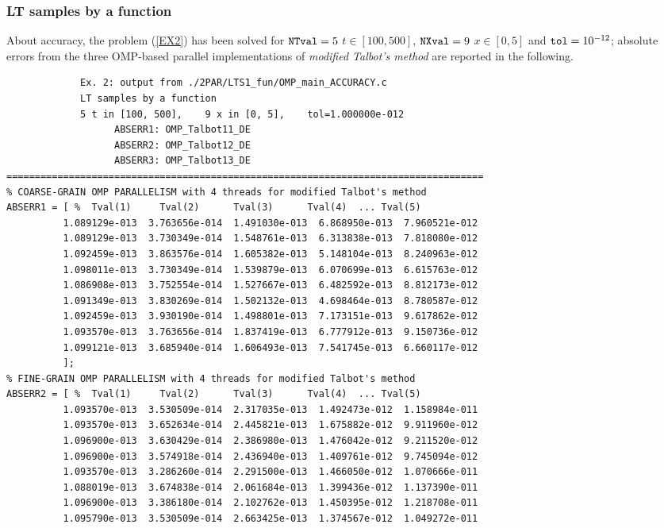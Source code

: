 \documentclass[a4paper,10pt]{report}%
\begin{document}
\subsubsection{LT samples by a function}
About accuracy, the problem (\ref{EX2}) has been solved for ${\tt NTval}=5$ $t\in[100, 500]$, ${\tt NXval}=9$
$x\in[0,5]$ and ${\tt tol}=10^{-12}$; absolute errors from the three OMP-based parallel implementations of
{\em modified Talbot's method} are reported in the following.
\begin{lstlisting}
             Ex. 2: output from ./2PAR/LTS1_fun/OMP_main_ACCURACY.c
             LT samples by a function
             5 t in [100, 500],    9 x in [0, 5],    tol=1.000000e-012
                   ABSERR1: OMP_Talbot11_DE
                   ABSERR2: OMP_Talbot12_DE
                   ABSERR3: OMP_Talbot13_DE
====================================================================================
% COARSE-GRAIN OMP PARALLELISM with 4 threads for modified Talbot's method
ABSERR1 = [ %  Tval(1)     Tval(2)      Tval(3)      Tval(4)  ... Tval(5)
          1.089129e-013  3.763656e-014  1.491030e-013  6.868950e-013  7.960521e-012
          1.089129e-013  3.730349e-014  1.548761e-013  6.313838e-013  7.818080e-012
          1.092459e-013  3.863576e-014  1.605382e-013  5.148104e-013  8.240963e-012
          1.098011e-013  3.730349e-014  1.539879e-013  6.070699e-013  6.615763e-012
          1.086908e-013  3.752554e-014  1.527667e-013  6.482592e-013  8.812173e-012
          1.091349e-013  3.830269e-014  1.502132e-013  4.698464e-013  8.780587e-012
          1.092459e-013  3.930190e-014  1.498801e-013  7.173151e-013  9.617862e-012
          1.093570e-013  3.763656e-014  1.837419e-013  6.777912e-013  9.150736e-012
          1.099121e-013  3.685940e-014  1.606493e-013  7.541745e-013  6.660117e-012
          ];
% FINE-GRAIN OMP PARALLELISM with 4 threads for modified Talbot's method
ABSERR2 = [ %  Tval(1)     Tval(2)      Tval(3)      Tval(4)  ... Tval(5)
          1.093570e-013  3.530509e-014  2.317035e-013  1.492473e-012  1.158984e-011
          1.093570e-013  3.652634e-014  2.445821e-013  1.675882e-012  9.911960e-012
          1.096900e-013  3.630429e-014  2.386980e-013  1.476042e-012  9.211520e-012
          1.096900e-013  3.574918e-014  2.436940e-013  1.409761e-012  9.745094e-012
          1.093570e-013  3.286260e-014  2.291500e-013  1.466050e-012  1.070666e-011
          1.088019e-013  3.674838e-014  2.061684e-013  1.399436e-012  1.137390e-011
          1.096900e-013  3.386180e-014  2.102762e-013  1.450395e-012  1.218708e-011
          1.095790e-013  3.530509e-014  2.663425e-013  1.374567e-012  1.049272e-011

\end{lstlisting}
\end{document}
